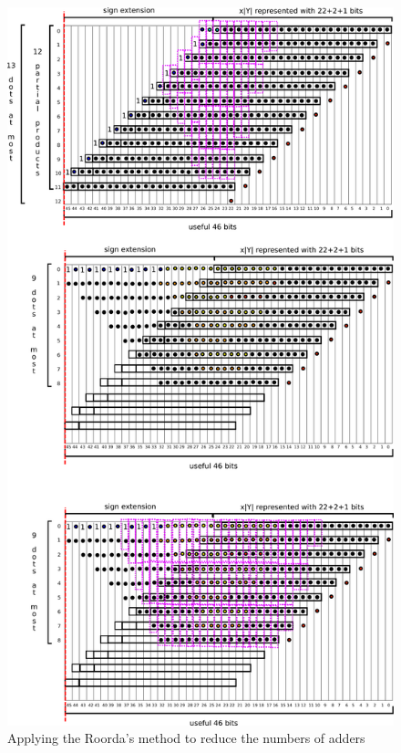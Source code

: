 \documentclass[a4paper]{article}
\begin{document}
	\begin{figure}[hbtp]
	\centering
	\includegraphics[width=.6\linewidth]{media/v1_FA_dadda_bindings_3.png}
	\caption{Applying the Roorda's method to reduce the numbers of adders}
	\label{fig:v1-bind3}
	\end{figure}
\end{document}
